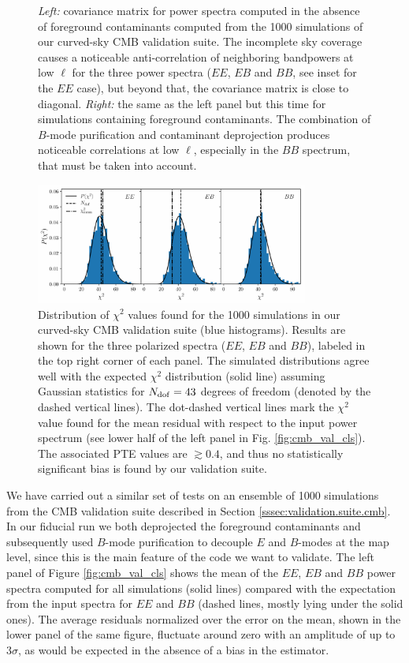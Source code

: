 \documentclass[usenatbib]{mnrasb}
\begin{document}
\begin{figure}
        \caption{{\sl Left:} covariance matrix for power spectra computed in the absence of foreground contaminants computed from the 1000 simulations of our curved-sky CMB validation suite. The incomplete sky coverage causes a noticeable anti-correlation of neighboring bandpowers at low $\ell$ for the three power spectra ($EE$, $EB$ and $BB$, see inset for the $EE$ case), but beyond that, the covariance matrix is close to diagonal. {\sl Right:} the same as the left panel but this time for simulations containing foreground contaminants. The combination of $B$-mode purification and contaminant deprojection produces noticeable correlations at low $\ell$, especially in the $BB$ spectrum, that must be taken into account.} \label{fig:cmb_val_cov}
      \end{figure}
      \begin{figure}
        \centering
        \includegraphics[width=0.80\textwidth]{val_chi2_cmb_sph}
        \caption{Distribution of $\chi^2$ values found for the 1000 simulations in our curved-sky CMB validation suite (blue histograms). Results are shown for the three polarized spectra ($EE$, $EB$ and $BB$), labeled in the top right corner of each panel. The simulated distributions agree well with the expected $\chi^2$ distribution (solid line) assuming Gaussian statistics for $N_{\rm dof}=43$ degrees of freedom (denoted by the dashed vertical lines). The dot-dashed vertical lines mark the $\chi^2$ value found for the mean residual with respect to the input power spectrum (see lower half of the left panel in Fig. \ref{fig:cmb_val_cls}). The associated PTE values are $\gtrsim0.4$, and thus no statistically significant bias is found by our validation suite.} \label{fig:cmb_val_chi2}
      \end{figure}
      We have carried out a similar set of tests on an ensemble of 1000 simulations from the CMB validation suite described in Section \ref{sssec:validation.suite.cmb}. In our fiducial run we both deprojected the foreground contaminants and subsequently used $B$-mode purification to decouple $E$ and $B$-modes at the map level, since this is the main feature of the code we want to validate. The left panel of Figure \ref{fig:cmb_val_cls} shows the mean of the $EE$, $EB$ and $BB$ power spectra computed for all simulations (solid lines) compared with the expectation from the input spectra for $EE$ and $BB$ (dashed lines, mostly lying under the solid ones). The average residuals normalized over the error on the mean, shown in the lower panel of the same figure, fluctuate around zero with an amplitude of up to $3\sigma$, as would be expected in the absence of a bias in the estimator. 
\end{document}
